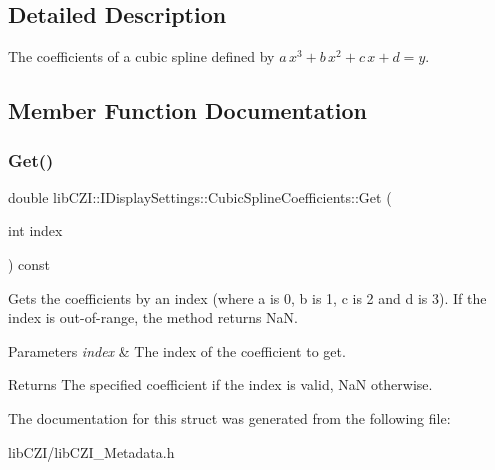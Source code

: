 \subsection{Detailed Description}
The coefficients of a cubic spline defined by $a\,x^3 + b\,x^2 + c\,x + d =y$. 

\subsection{Member Function Documentation}
\mbox{\label{structlib_c_z_i_1_1_i_display_settings_1_1_cubic_spline_coefficients_acc14d3e8c764bc2fe6c60f66e3a9a42d}} 
\subsubsection{\texorpdfstring{Get()}{Get()}}
{\footnotesize\ttfamily double lib\+C\+Z\+I\+::\+I\+Display\+Settings\+::\+Cubic\+Spline\+Coefficients\+::\+Get (\begin{DoxyParamCaption}\item[{int}]{index }\end{DoxyParamCaption}) const\hspace{0.3cm}{\ttfamily [inline]}}

Gets the coefficients by an index (where a is 0, b is 1, c is 2 and d is 3). If the index is out-\/of-\/range, the method returns NaN.


\begin{DoxyParams}{Parameters}
{\em index} & The index of the coefficient to get.\\
\hline
\end{DoxyParams}
\begin{DoxyReturn}{Returns}
The specified coefficient if the index is valid, NaN otherwise. 
\end{DoxyReturn}


The documentation for this struct was generated from the following file\+:\begin{DoxyCompactItemize}
\item 
lib\+C\+Z\+I/lib\+C\+Z\+I\+\_\+\+Metadata.\+h\end{DoxyCompactItemize}
